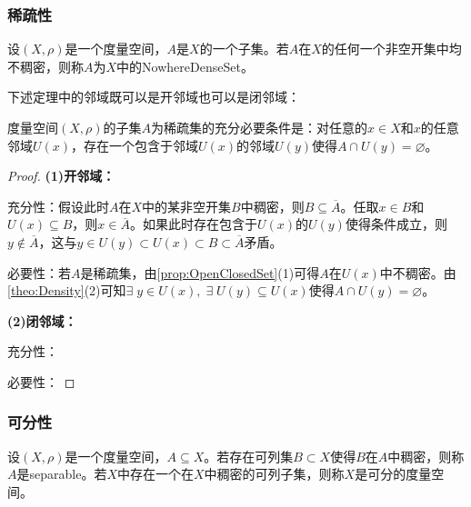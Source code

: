 \subsubsection{稀疏性}
\begin{definition}
	设$(X,\rho)$是一个度量空间，$A$是$X$的一个子集。若$A$在$X$的任何一个非空开集中均不稠密，则称$A$为$X$中的\gls{NowhereDenseSet}。
\end{definition}
下述定理中的邻域既可以是开邻域也可以是闭邻域：
\begin{theorem}
	度量空间$(X,\rho)$的子集$A$为稀疏集的充分必要条件是：对任意的$x\in X$和$x$的任意邻域$U(x)$，存在一个包含于邻域$U(x)$的邻域$U(y)$使得$A\cap U(y)=\varnothing$。
\end{theorem}
\begin{proof}
	\textbf{(1)开邻域：}\par
	充分性：假设此时$A$在$X$中的某非空开集$B$中稠密，则$B\subseteq\overline{A}$。任取$x\in B$和$U(x)\subseteq B$，则$x\in\overline{A}$。如果此时存在包含于$U(x)$的$U(y)$使得条件成立，则$y\notin\overline{A}$，这与$y\in U(y)\subset U(x)\subset B\subset\overline{A}$矛盾。\par
	必要性：若$A$是稀疏集，由\cref{prop:OpenClosedSet}(1)可得$A$在$U(x)$中不稠密。由\cref{theo:Density}(2)可知$\exists\;y\in U(x),\;\exists\;U(y)\subseteq U(x)$使得$A\cap U(y)=\varnothing$。\par
	\textbf{(2)闭邻域：}\par
	充分性：\par
	必要性：
\end{proof}
\subsubsection{可分性}
\begin{definition}
	设$(X,\rho)$是一个度量空间，$A\subseteq X$。若存在可列集$B\subset X$使得$B$在$A$中稠密，则称$A$是\gls{separable}。若$X$中存在一个在$X$中稠密的可列子集，则称$X$是可分的度量空间。
\end{definition}
